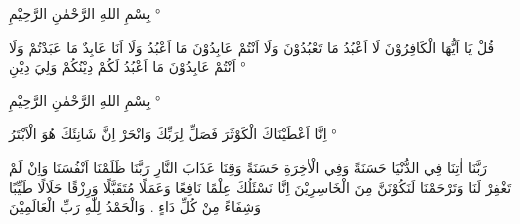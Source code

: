 \begin{twocol}
\begin{leftcol}
\par
بِسْمِ اللهِ الرَّحْمٰنِ الرَّحِيْمِ {\latinfont°}
\par
قُلْ يَا اَيُّهَا الْكَافِرُوْنَ لَا اَعْبُدُ مَا تَعْبُدُوْنَ وَلَا اَنْتُمْ عَابِدُوْنَ مَا اَعْبُدُ وَلَا اَنَا عَابِدٌ مَا عَبَدْتُمْ وَلَا اَنْتُمْ عَابِدُوْنَ مَا اَعْبُدُ لَكُمْ دِيْنُكُمْ وَلِيَ دِيْنِ {\latinfont°}
\par
بِسْمِ اللهِ الرَّحْمٰنِ الرَّحِيْمِ {\latinfont°}
\par
اِنَّا اَعْطَيْنَاكَ الْكَوْثَرَ فَصَلِّ لِرَبِّكَ وَانْحَرْ اِنَّ شَانِئَكَ هُوَ الْاَبْتَرُ {\latinfont°}
\par
رَبَّنَا اٰتِنَا فِي الدُّنْيَا حَسَنَةً وَفِي الْاٰخِرَةِ حَسَنَةً وَقِنَا عَذَابَ النَّارِ رَبَّنَا ظَلَمْنَا اَنْفُسَنَا وَاِنْ لَمْ تَغْفِرْ لَنَا وَتَرْحَمْنَا لَنَكُوْنَنَّ مِنَ الْخَاسِرِيْنَ اِنَّا نَسْئَلُكَ عِلْمًا نَافِعًا وَعَمَلًا مُتَقَبَّلًا وَرِزْقًا حَلَالًا طَيِّبًا وَشِفَاءً مِنْ كُلِّ دَاءٍ . وَالْحَمْدُ لِلّٰهِ رَبِّ الْعَالَمِيْنَ
\par
\end{leftcol}
\end{twocol}
